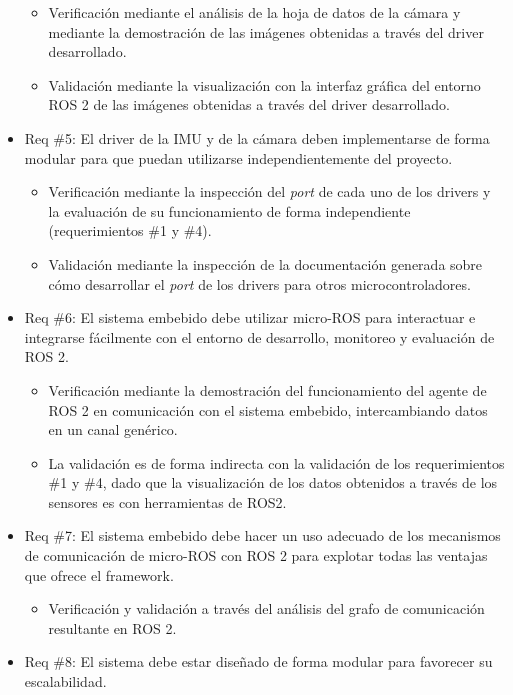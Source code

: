 \documentclass[
11pt, %
codirector, %
]{charter}
\begin{document}
\begin{itemize}
	\begin{itemize}
		\item Verificación mediante el análisis de la hoja de datos de la cámara y mediante la demostración de las imágenes obtenidas a través del driver desarrollado.
		\item Validación mediante la visualización con la interfaz gráfica del entorno ROS 2 de las imágenes obtenidas a través del driver desarrollado.
	\end{itemize}
	\item Req \#5: El driver de la IMU y de la cámara deben implementarse de forma modular para que puedan utilizarse independientemente del proyecto.
	\begin{itemize}
		\item Verificación mediante la inspección del \textit{port} de cada uno de los drivers y la evaluación de su funcionamiento de forma independiente (requerimientos \#1 y \#4).
		\item Validación mediante la inspección de la documentación generada sobre cómo desarrollar el \textit{port} de los drivers para otros microcontroladores.
	\end{itemize}
	\item Req \#6: El sistema embebido debe utilizar micro-ROS para interactuar e integrarse fácilmente con el entorno de desarrollo, monitoreo y evaluación de ROS 2.
	\begin{itemize}
		\item Verificación mediante la demostración del funcionamiento del agente de ROS 2 en comunicación con el sistema embebido, intercambiando datos en un canal genérico.
		\item La validación es de forma indirecta con la validación de los requerimientos \#1 y \#4, dado que la visualización de los datos obtenidos a través de los sensores es con herramientas de ROS2.
	\end{itemize}
	\item Req \#7: El sistema embebido debe hacer un uso adecuado de los mecanismos de comunicación de micro-ROS con ROS 2 para explotar todas las ventajas que ofrece el framework.
	\begin{itemize}
		\item Verificación y validación a través del análisis del grafo de comunicación resultante en ROS 2. 
	\end{itemize}
	\item Req \#8: El sistema debe estar diseñado de forma modular para favorecer su escalabilidad.
	\begin{itemize}

\end{itemize}
\end{itemize}
\end{document}

